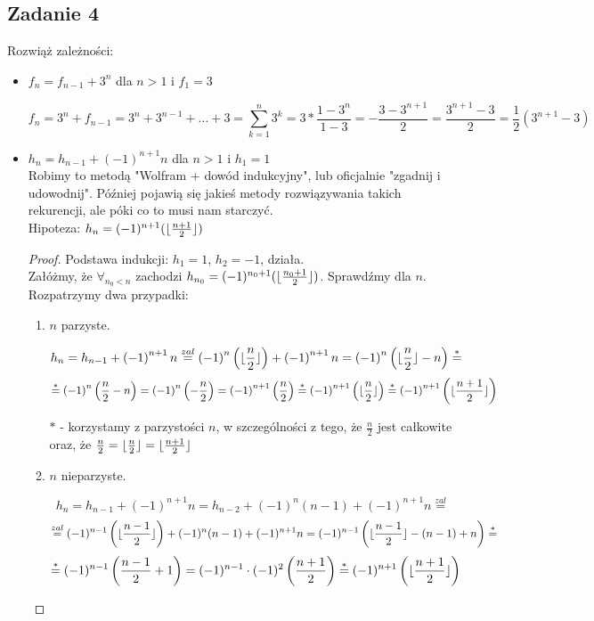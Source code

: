 \documentclass[a4paper]{article}
\DeclarePairedDelimiter\floor{\lfloor}{\rfloor}
\begin{document}
\subsection*{Zadanie 4}
Rozwiąż zależności:

\begin{itemize}
\item $f_n = f_{n-1}+3^n$ dla $n>1$ i $f_1=3$

$$f_n=3^n+f_{n-1} = 3^n + 3^{n-1} + \ldots + 3 = \sum_{k=1}^n 3^k = 3*\frac{1-3^n}{1-3} = - \frac{3 - 3^{n+1}}{2} = \frac{3^{n+1}-3}{2} = \frac{1}{2}(3^{n+1}-3)$$

\item $h_n = h_{n-1} + (-1)^{n+1}n$ dla $n>1$ i $h_1=1$\\
Robimy to metodą "Wolfram + dowód indukcyjny", lub oficjalnie "zgadnij i udowodnij". Później pojawią się jakieś metody rozwiązywania takich rekurencji, ale póki co to musi nam starczyć.\\
Hipoteza: $h_n=(-1)^{n+1}(\floor{\frac{n+1}{2}})$
\begin{proof}
Podstawa indukcji: $h_1=1$, $h_2=-1$, działa.\\
Załóżmy, że $\forall_{n_0<n}$ zachodzi $h_{n_0}=(-1)^{n_0+1}(\floor{\frac{n_0+1}{2}})$. Sprawdźmy dla $n$. Rozpatrzymy dwa przypadki:
\begin{enumerate}[(1)]
\item $n$ parzyste.

$$h_n=h_{n-1}+\left(-1\right)^{n+1}n \overset{zal}{=} \left(-1\right)^n\left(\floor{\frac{n}{2}}\right)+\left(-1\right)^{n+1}n=\left(-1\right)^n \left(\floor{\frac{n}{2}} - n\right) \overset{*}{=} $$ 
$$\overset{*}{=} \left(-1\right)^n \left(\frac{n}{2} - n\right) = \left(-1\right)^n \left( - \frac{n}{2}\right) = \left(-1\right)^{n+1} \left(\frac{n}{2}\right) \overset{*}{=}\left(-1\right)^{n+1} \left(\floor{\frac{n}{2}}\right) \overset{*}{=}\left(-1\right)^{n+1} \left(\floor{\frac{n+1}{2}}\right)$$

$*$ - korzystamy z parzystości $n$, w szczególności z tego, że $\frac{n}{2}$ jest całkowite oraz, że $\frac{n}{2}=\floor{\frac{n}{2}}=\floor{\frac{n+1}{2}}$

\item $n$ nieparzyste.

$$h_n=h_{n-1}+(-1)^{n+1}n = h_{n-2}+(-1)^n(n-1)+(-1)^{n+1}n \overset{zal}{=}$$ $$ \overset{zal}{=} (-1)^{n-1}\left( \floor{\frac{n-1}{2}} \right) + (-1)^n(n-1)+(-1)^{n+1}n = (-1)^{n-1}\left( \floor{\frac{n-1}{2}} - (n-1) + n \right) \overset{*}{=} $$ $$ \overset{*}{=} (-1)^{n-1}\left(\frac{n-1}{2} + 1\right)= (-1)^{n-1}\cdot(-1)^2 \left( \frac{n+1}{2} \right) \overset{*}{=} (-1)^{n+1} \left( \floor{\frac{n+1}{2}} \right) $$


\end{enumerate}
\end{proof}
\end{itemize}
\end{document}
